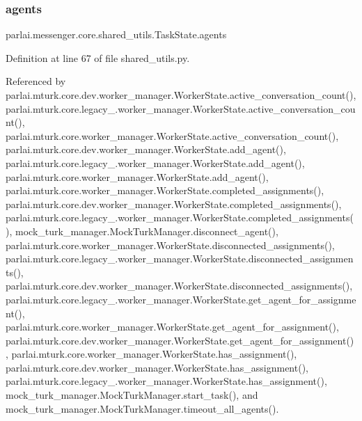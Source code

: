 \subsubsection{\texorpdfstring{agents}{agents}}
{\footnotesize\ttfamily parlai.\+messenger.\+core.\+shared\+\_\+utils.\+Task\+State.\+agents}



Definition at line 67 of file shared\+\_\+utils.\+py.



Referenced by parlai.\+mturk.\+core.\+dev.\+worker\+\_\+manager.\+Worker\+State.\+active\+\_\+conversation\+\_\+count(), parlai.\+mturk.\+core.\+legacy\+\_.\+worker\+\_\+manager.\+Worker\+State.\+active\+\_\+conversation\+\_\+count(), parlai.\+mturk.\+core.\+worker\+\_\+manager.\+Worker\+State.\+active\+\_\+conversation\+\_\+count(), parlai.\+mturk.\+core.\+dev.\+worker\+\_\+manager.\+Worker\+State.\+add\+\_\+agent(), parlai.\+mturk.\+core.\+legacy\+\_.\+worker\+\_\+manager.\+Worker\+State.\+add\+\_\+agent(), parlai.\+mturk.\+core.\+worker\+\_\+manager.\+Worker\+State.\+add\+\_\+agent(), parlai.\+mturk.\+core.\+worker\+\_\+manager.\+Worker\+State.\+completed\+\_\+assignments(), parlai.\+mturk.\+core.\+dev.\+worker\+\_\+manager.\+Worker\+State.\+completed\+\_\+assignments(), parlai.\+mturk.\+core.\+legacy\+\_.\+worker\+\_\+manager.\+Worker\+State.\+completed\+\_\+assignments(), mock\+\_\+turk\+\_\+manager.\+Mock\+Turk\+Manager.\+disconnect\+\_\+agent(), parlai.\+mturk.\+core.\+worker\+\_\+manager.\+Worker\+State.\+disconnected\+\_\+assignments(), parlai.\+mturk.\+core.\+legacy\+\_.\+worker\+\_\+manager.\+Worker\+State.\+disconnected\+\_\+assignments(), parlai.\+mturk.\+core.\+dev.\+worker\+\_\+manager.\+Worker\+State.\+disconnected\+\_\+assignments(), parlai.\+mturk.\+core.\+legacy\+\_.\+worker\+\_\+manager.\+Worker\+State.\+get\+\_\+agent\+\_\+for\+\_\+assignment(), parlai.\+mturk.\+core.\+worker\+\_\+manager.\+Worker\+State.\+get\+\_\+agent\+\_\+for\+\_\+assignment(), parlai.\+mturk.\+core.\+dev.\+worker\+\_\+manager.\+Worker\+State.\+get\+\_\+agent\+\_\+for\+\_\+assignment(), parlai.\+mturk.\+core.\+worker\+\_\+manager.\+Worker\+State.\+has\+\_\+assignment(), parlai.\+mturk.\+core.\+dev.\+worker\+\_\+manager.\+Worker\+State.\+has\+\_\+assignment(), parlai.\+mturk.\+core.\+legacy\+\_.\+worker\+\_\+manager.\+Worker\+State.\+has\+\_\+assignment(), mock\+\_\+turk\+\_\+manager.\+Mock\+Turk\+Manager.\+start\+\_\+task(), and mock\+\_\+turk\+\_\+manager.\+Mock\+Turk\+Manager.\+timeout\+\_\+all\+\_\+agents().


